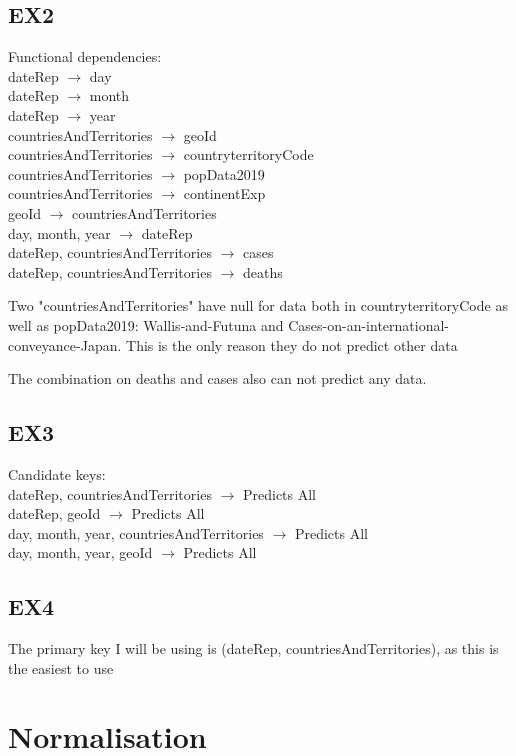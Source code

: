 \documentclass{article}
\begin{document}
\subsection{EX2}
Functional dependencies: \\
dateRep $\rightarrow$ day \\
dateRep $\rightarrow$ month \\
dateRep $\rightarrow$ year \\
countriesAndTerritories $\rightarrow$ geoId \\
countriesAndTerritories $\rightarrow$ countryterritoryCode \\
countriesAndTerritories $\rightarrow$ popData2019 \\
countriesAndTerritories $\rightarrow$ continentExp \\
geoId $\rightarrow$ countriesAndTerritories \\
day, month, year $\rightarrow$ dateRep \\
dateRep, countriesAndTerritories $\rightarrow$ cases \\
dateRep, countriesAndTerritories $\rightarrow$ deaths \par
Two "countriesAndTerritories" have null for data both in countryterritoryCode as well as popData2019: Wallis-and-Futuna and Cases-on-an-international-conveyance-Japan. This is the only reason they do not predict other data \par
The combination on deaths and cases also can not predict any data.

\subsection{EX3}
Candidate keys: \\
dateRep, countriesAndTerritories $\rightarrow$ Predicts All \\
dateRep, geoId $\rightarrow$ Predicts All \\
day, month, year, countriesAndTerritories $\rightarrow$ Predicts All \\
day, month, year, geoId $\rightarrow$ Predicts All \\

\subsection{EX4}
The primary key I will be using is (dateRep, countriesAndTerritories), as this is the easiest to use

\section{Normalisation}
\end{document}

